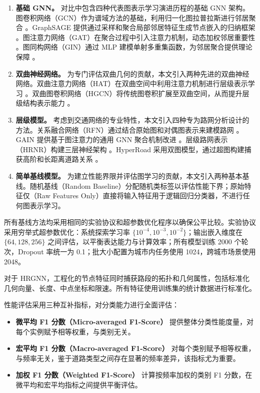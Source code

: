 \begin{enumerate}
\item \textbf{基础 GNN。} 对比中包含四种代表图表示学习演进历程的基础 GNN 架构。图卷积网络（GCN）作为谱域方法的基础，利用归一化图拉普拉斯进行邻居聚合 \cite{Kipf2017}。GraphSAGE 提供通过采样和聚合局部邻居特征生成节点嵌入的归纳框架 \cite{Hamilton2017}。图注意力网络（GAT）在聚合过程中引入注意力机制，动态加权邻居重要性 \cite{Velickovic2018}。图同构网络（GIN）通过 MLP 建模单射多重集函数，为邻居聚合提供理论保障 \cite{Xu2019}。

\item \textbf{双曲神经网络。} 为专门评估双曲几何的贡献，本文引入两种先进的双曲神经网络。双曲注意力网络（HAT）在双曲空间中利用注意力机制进行层级表示学习 \cite{Gulcehre2019}。双曲图卷积网络（HGCN）将传统图卷积扩展至双曲空间，从而提升层级结构表示能力 \cite{Chami2019}。

\item \textbf{层级模型。} 考虑到交通网络的专业特性，本文引入四种专为路网分析设计的方法。关系融合网络（RFN）通过结合原始图和对偶图表示来建模路网 \cite{Jepsen2022}。GAIN 提供基于图注意力的通用 GNN 聚合机制改进 \cite{gharaee2021pr}。层级路网表示（HRNR）构建三层神经架构 \cite{Wu2020}。HyperRoad 采用双图模型，通过超图构建捕获高阶和长距离道路关系 \cite{Zhang2023}。

\item \textbf{简单基线模型。} 为建立性能界限并评估图学习的贡献，本文引入两种基本基线。随机基线（Random Baseline）分配随机类标签以评估性能下界；原始特征仅（Raw Features Only）直接将输入特征用于逻辑回归分类器，不进行任何图表示学习。
\end{enumerate}

所有基线方法均采用相同的实验协议和超参数优化程序以确保公平比较。实验协议采用穷举式超参数优化：系统探索学习率 $\{10^{-4}, 10^{-3}, 10^{-2}\}$；输出嵌入维度在 $\{64, 128, 256\}$ 之间评估，以平衡表达能力与计算效率；所有模型训练 2000 个轮次，Dropout 率统一为 0.1；批大小配置为城市内任务使用 1024，跨城市场景使用 2048。

对于 HRGNN，工程化的节点特征同时捕获路段的拓扑和几何属性，包括标准化几何向量、长度、中点坐标和限速。所有特征使用训练集的统计数据进行标准化。

性能评估采用三种互补指标，对分类能力进行全面评估：

\begin{itemize}
\item \textbf{微平均 F1 分数（Micro-averaged F1-Score）} 提供整体分类性能度量，对每个实例赋予相等权重，与类别无关。

\item \textbf{宏平均 F1 分数（Macro-averaged F1-Score）} 对每个类别赋予相等权重，与频率无关，鉴于道路类型之间存在显著的频率差异，该指标尤为重要。

\item \textbf{加权 F1 分数（Weighted F1-Score）} 计算按频率加权的类别 F1 分数，在微平均和宏平均指标之间提供平衡评估。
\end{itemize}

